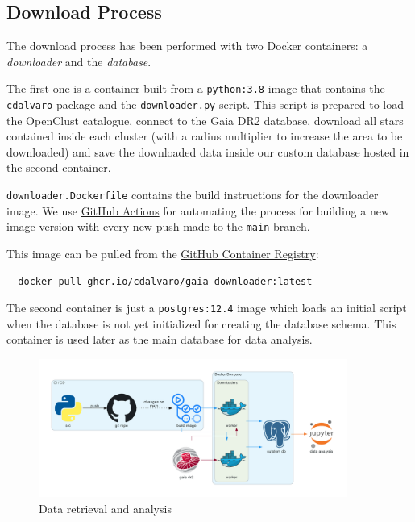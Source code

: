\documentclass[11pt, a4paper, english]{book}
\begin{document}
\subsection{Download Process}

The download process has been performed with two Docker containers: a \emph{downloader} and the \emph{database}.

The first one is a container built from a \verb|python:3.8| image that contains the \verb|cdalvaro| package
and the \verb|downloader.py| script.
This script is prepared to load the OpenClust catalogue, connect to the Gaia DR2 database,
download all stars contained inside each cluster (with a radius multiplier to increase the area to be downloaded)
and save the downloaded data inside our custom database hosted in the second container.

\verb|downloader.Dockerfile| contains the build instructions for the downloader image.
We use \href{https://github.com/features/actions}{GitHub Actions} for automating the process
for building a new image version with every new push made to the \verb|main| branch.

This image can be pulled from the
\href{https://github.blog/2020-09-01-introducing-github-container-registry/}{GitHub Container Registry}:

\begin{verbatim}
  docker pull ghcr.io/cdalvaro/gaia-downloader:latest
\end{verbatim}

The second container is just a \verb|postgres:12.4| image which loads an initial script when
the database is not yet initialized for creating the database schema.
This container is used later as the main database for data analysis.

\begin{figure}[htbp]
  \centering
  \includegraphics[width=0.9\textwidth]{../figures/services_diagram.pdf}
  \caption{Data retrieval and analysis}
  \label{fig:services_diagram}
\end{figure}
\end{document}
